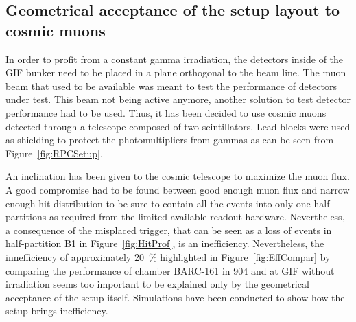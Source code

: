 	\subsection{Geometrical acceptance of the setup layout to cosmic muons}
	\label{ssec:GeoAcc}
				
		In order to profit from a constant gamma irradiation, the detectors inside of the GIF bunker need to be placed in a plane orthogonal to the beam line. The muon beam that used to be available was meant to test the performance of detectors under test. This beam not being active anymore, another solution to test detector performance had to be used. Thus, it has been decided to use cosmic muons detected through a telescope composed of two scintillators. Lead blocks were used as shielding to protect the photomultipliers from gammas as can be seen from Figure~\ref{fig:RPCSetup}.
					
		An inclination has been given to the cosmic telescope to maximize the muon flux. A good compromise had to be found between good enough muon flux and narrow enough hit distribution to be sure to contain all the events into only one half partitions as required from the limited available readout hardware. Nevertheless, a consequence of the misplaced trigger, that can be seen as a loss of events in half-partition B1 in Figure~\ref{fig:HitProf}, is an inefficiency. Nevertheless, the innefficiency of approximately \SI{20}{\%} highlighted in Figure~\ref{fig:EffCompar} by comparing the performance of chamber BARC-161 in 904 and at GIF without irradiation seems too important to be explained only by the geometrical acceptance of the setup itself. Simulations have been conducted to show how the setup brings inefficiency.
	
